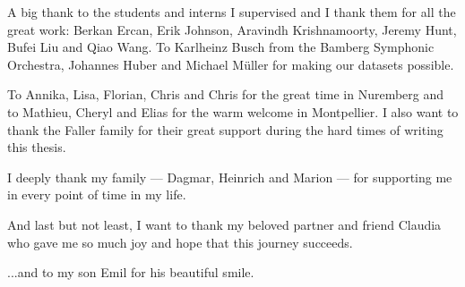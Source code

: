 A big thank to the students and interns I supervised and I thank them for all the great work: Berkan Ercan, Erik Johnson, Aravindh Krishnamoorty, Jeremy Hunt, Bufei Liu and Qiao Wang. 
To Karlheinz Busch from the Bamberg Symphonic Orchestra, Johannes Huber and Michael Müller for making our datasets possible. 

\bigskip

To Annika, Lisa, Florian, Chris and Chris for the great time in Nuremberg and to Mathieu, Cheryl and Elias for the warm welcome in Montpellier.
I also want to thank the Faller family for their great support during the hard times of writing this thesis.

\bigskip

I deeply thank my family --- Dagmar, Heinrich and Marion --- for supporting me in every point of time in my life.

\bigskip

And last but not least, I want to thank my beloved partner and friend Claudia who gave me so much joy and hope that this journey succeeds.

\bigskip

...and to my son Emil for his beautiful smile.

\endgroup
